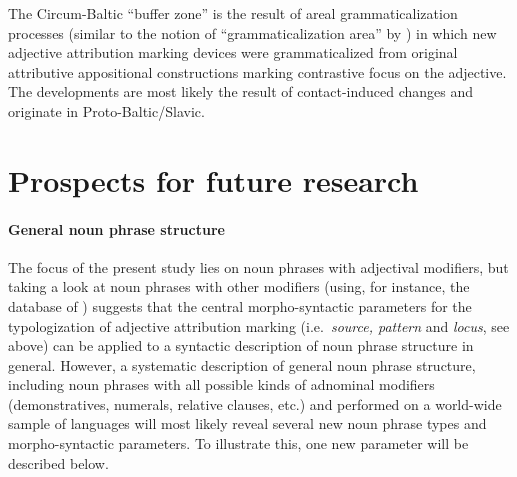 The Circum-Baltic “buffer zone” is the result of areal grammaticalization processes (similar to the notion of “grammaticalization area” by \cite{heine-etal2005}) in which new adjective attribution marking devices were grammaticalized from original attributive appositional constructions marking contrastive focus on the adjective. The developments are most likely the result of contact-induced changes and originate in Proto\hyp{}Baltic\slash{}Slavic.

\section{Prospects for future research}
\paragraph*{General noun phrase structure} The focus of the present study lies on noun phrases with adjectival modifiers, but taking a look at noun phrases with other modifiers (using, for instance, the  database of \citealt{AUTOTYP-NP}) suggests that the central morpho-syntactic parameters for the typologization of adjective attribution marking (i.e.~\textit{source, pattern} and \textit{locus}, see above) can be applied to a syntactic description of noun phrase structure in general. However, a systematic description of general noun phrase structure, including noun phrases with all possible kinds of adnominal modifiers (demonstratives, numerals, relative clauses, etc.) and performed on a world-wide sample of languages will most likely reveal several new noun phrase types and morpho-syntactic parameters. To illustrate this, one new parameter will be described below.   

